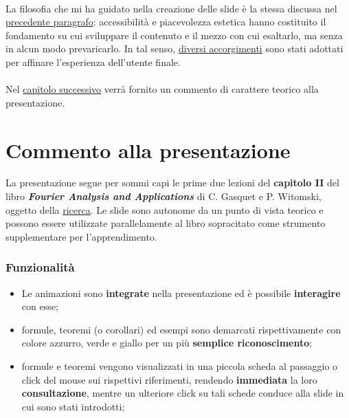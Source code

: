 \documentclass[
]{book}
\providecommand{\tightlist}{%
  \setlength{\itemsep}{0pt}\setlength{\parskip}{0pt}}
\begin{document}
\hypertarget{filosofia}{%
\subsubsection*{}\label{filosofia}}

La filosofia che mi ha guidato nella creazione delle slide è la stessa discussa nel \protect\hyperlink{animazioni}{precedente paragrafo}: accessibilità e piacevolezza estetica hanno costituito il fondamento su cui sviluppare il contenuto e il mezzo con cui esaltarlo, ma senza in alcun modo prevaricarlo. In tal senso, \protect\hyperlink{features}{diversi accorgimenti} sono stati adottati per affinare l'esperienza dell'utente finale.

\hypertarget{section}{%
\subsubsection*{}\label{section}}

Nel \protect\hyperlink{commento}{capitolo successivo} verrà fornito un commento di carattere teorico alla presentazione.

\hypertarget{commento}{%
\chapter{Commento alla presentazione}\label{commento}}

La presentazione segue per sommi capi le prime due lezioni del \textbf{capitolo II} del libro \emph{\textbf{Fourier Analysis and Applications}} di C. Gasquet e P. Witomski, oggetto della \protect\hyperlink{ricerca}{ricerca}. Le slide sono autonome da un punto di vista teorico e possono essere utilizzate parallelamente al libro sopracitato come strumento supplementare per l'apprendimento.

\hypertarget{features}{%
\subsection*{Funzionalità}\label{features}}

\begin{itemize}
\tightlist
\item
  Le animazioni sono \textbf{integrate} nella presentazione ed è possibile \textbf{interagire} con esse;
\item
  formule, teoremi (o corollari) ed esempi sono demarcati rispettivamente con colore azzurro, verde e giallo per un più \textbf{semplice riconoscimento};
\item
  formule e teoremi vengono visualizzati in una piccola scheda al passaggio o click del mouse sui rispettivi riferimenti, rendendo \textbf{immediata} la loro \textbf{consultazione}, mentre un ulteriore click su tali schede conduce alla slide in cui sono stati introdotti;
\end{itemize}
\end{document}
